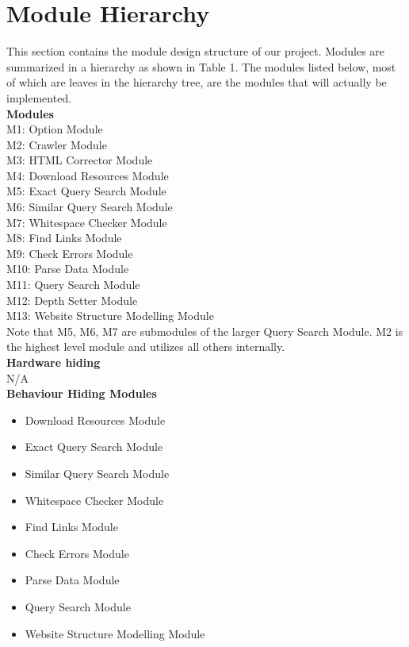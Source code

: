 \documentclass[titlepage]{article}
\begin{document}
\section{Module Hierarchy}
This section contains the module design structure of our project. Modules are summarized in a hierarchy as shown in Table 1. The modules listed below, most of which are leaves in the hierarchy tree, are the modules that will actually be implemented.
\\

\textbf{Modules}\\

M1: Option Module\\
M2: Crawler Module\\
M3: HTML Corrector Module\\
M4: Download Resources Module\\
M5: Exact Query Search Module\\
M6: Similar Query Search Module\\
M7: Whitespace Checker Module\\
M8: Find Links Module\\
M9: Check Errors Module\\
M10: Parse Data Module\\
M11: Query Search Module\\
M12: Depth Setter Module\\
M13: Website Structure Modelling Module\\

Note that M5, M6, M7 are submodules of the larger Query Search Module. M2 is the highest level module and utilizes all others internally.\\

\textbf{Hardware hiding}\\

N/A\\

\textbf{Behaviour Hiding Modules}

\begin{itemize}
\item{Download Resources Module}\\
\item{Exact Query Search Module}\\
\item{Similar Query Search Module}\\
\item{Whitespace Checker Module}\\
\item{Find Links Module}\\
\item{Check Errors Module}\\
\item{Parse Data Module}\\
\item{Query Search Module}\\
\item{Website Structure Modelling Module}\\
\end{itemize}
\end{document}
